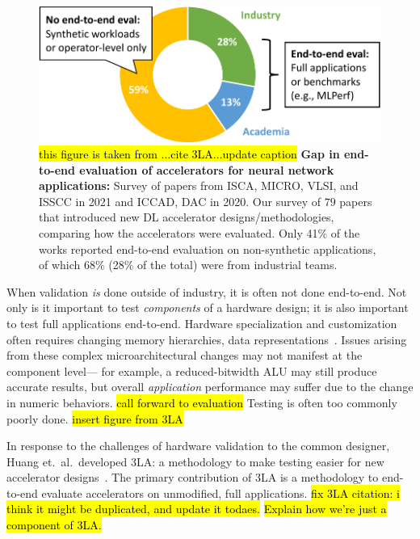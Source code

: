 \begin{figure}
\centering
\includegraphics[width=.6\textwidth]{assets/3la-pie.pdf}
\caption{
\hl{this figure is taken from ...cite 3LA...update caption}
\textbf{Gap in end-to-end evaluation of accelerators for neural network applications:} 
Survey of papers from ISCA, MICRO, VLSI, and ISSCC in 2021 and ICCAD, DAC in 2020.
Our survey of $79$ papers  that introduced new DL accelerator designs/methodologies, comparing how the accelerators were evaluated. Only 41\% of the works reported end-to-end evaluation on non-synthetic applications, of which 68\% (28\% of the total) were from industrial teams.
}
\label{fig:3la-pie}
\end{figure}


  
When validation \textit{is} done
  outside of industry,
  it is often not done end-to-end.
Not only is it important
  to test \textit{components}
  of a hardware design;
  it is also important
  to test full applications end-to-end.
Hardware specialization and customization often
  requires changing memory hierarchies,
  data representations~\cite{chan2014itrs,fang2019understanding,lai2021programming}.
Issues arising from these complex
  microarchitectural changes
  may not manifest
  at the component level---%
  for example, a reduced-bitwidth
  ALU
  may still produce accurate results,
  but overall \textit{application}
  performance
  may suffer
  due to the change in numeric behaviors.
\hl{call forward to evaluation}
Testing is often 
  too commonly poorly done.
\hl{insert figure from 3LA}


In response to the challenges
  of hardware validation
  to the common designer,
  Huang et.~al.~developed
  3LA:
  a methodology
  to make testing
  easier for new accelerator designs~\cite{huang2022specialized,huang2024application}.
The primary contribution of 3LA
  is 
  a methodology to end-to-end evaluate accelerators on unmodified, full applications.
\hl{fix 3LA citation: i think it might be duplicated, and update it todaes.}
\hl{Explain how we're just a component of 3LA.}

